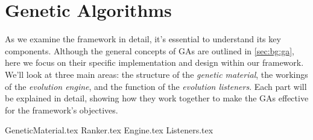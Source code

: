 \section{Genetic Algorithms}
\label{sec:genetic_algorithms}
  As we examine the framework in detail, it's essential to understand its key components. Although the general concepts of GAs are outlined in \vref{sec:bg:ga}, here we focus on their specific implementation and design within our framework. We'll look at three main areas: the structure of the \emph{genetic material}, the workings of the \emph{evolution engine}, and the function of the \emph{evolution listeners}. Each part will be explained in detail, showing how they work together to make the GAs effective for the framework's objectives.
  
  {GeneticMaterial.tex}
  {Ranker.tex}
  {Engine.tex}    
  {Listeners.tex}
